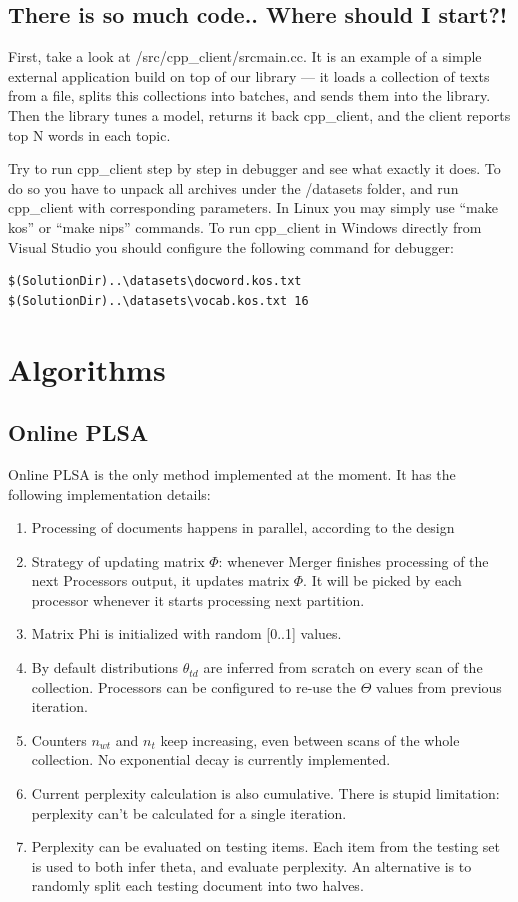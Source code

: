 \documentclass[11pt,a4paper,twoside]{report}
\begin{document}
\subsection{There is so much code.. Where should I start?!}

First, take a look at /src/cpp\_client/srcmain.cc.
It is an example of a simple external application build on top of our library ---
it loads a collection of texts from a file,
splits this collections into batches, and sends them into the library.
Then the library tunes a model,
returns it back cpp\_client,
and the client reports top N words in each topic.

Try to run cpp\_client step by step in debugger and see what exactly it does.
To do so you have to unpack all archives under the /datasets folder,
and run cpp\_client with corresponding parameters.
In Linux you may simply use ``make kos'' or ``make nips'' commands.
To run cpp\_client in Windows directly from Visual Studio
you should configure the following command for debugger:

{\small
\begin{verbatim}
$(SolutionDir)..\datasets\docword.kos.txt $(SolutionDir)..\datasets\vocab.kos.txt 16
\end{verbatim}}

\section{Algorithms}

\subsection{Online PLSA}
Online PLSA is the only method implemented at the moment.
It has the following implementation details:
\begin{enumerate}
    \item Processing of documents happens in parallel, according to the design
    \item Strategy of updating matrix $\Phi$: whenever Merger finishes processing of the next Processors output,
    it updates matrix $\Phi$. It will be picked by each processor whenever it starts processing next partition.
    \item Matrix Phi is initialized with random [0..1] values.
    \item By default distributions $\theta_{t d}$ are inferred from scratch on every scan of the collection.
          Processors can be configured to re-use the $\Theta$ values from previous iteration.
    \item Counters $n_{w t}$ and $n_t$ keep increasing, even between scans of the whole collection.
          No exponential decay is currently implemented.
    \item Current perplexity calculation is also cumulative.
          There is stupid limitation: perplexity can't be calculated for a single iteration.
    \item Perplexity can be evaluated on testing items.
          Each item from the testing set is used to both infer theta, and evaluate perplexity.
          An alternative is to randomly split each testing document into two halves.
\end{enumerate}
\end{document}
